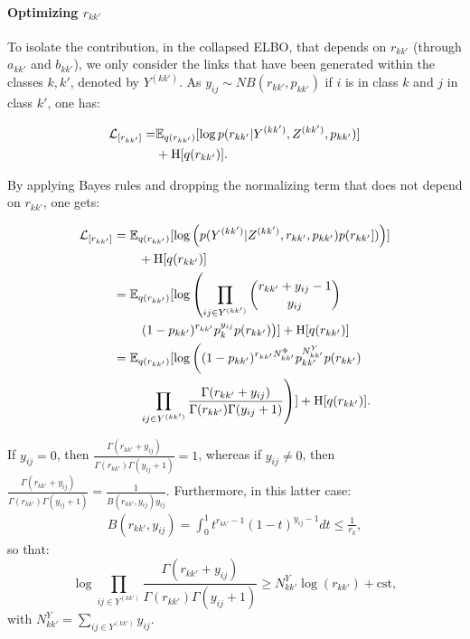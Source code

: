 \paragraph{Optimizing $r_{kk'}$}

To isolate the contribution, in the collapsed ELBO, that depends on $r_{kk'}$ (through $a_{kk'}$ and $b_{kk'}$), we only consider the links that have been generated within the classes $k,k'$, denoted by $Y^{(kk')}$. As $y_{ij} \sim NB(r_{kk'}, p_{kk'})$ if $i$ is in class $k$ and $j$ in class $k'$, one has:

\begin{align*}
\mathcal{L}_{[r_{kk'}]} = & \mathbb{E}_{q(r_{kk'})}[\log p(r_{kk'}|Y^{(kk')},Z^{(kk')},p_{kk'})] \\
& + \textrm{H}[q(r_{kk'})].
\end{align*}

By applying Bayes rules and dropping the normalizing term that does not depend on $r_{kk'}$, one gets:

\small{
\begin{align*}
\mathcal{L}_{[r_{kk'}]} &= \mathbb{E}_{q(r_{kk'})}[\log \left( p(Y^{(kk')}|Z^{(kk')}, r_{kk'}, p_{kk'}) p(r_{kk'}]) \right)] \\
	& \qquad + \textrm{H}[q(r_{kk'})] \\
    &= \mathbb{E}_{q(r_{kk'})}[\log \left( \prod_{ij\in Y^{(kk')}} \dbinom{r_{kk'} + y_{ij}-1}{y_{ij}} \right. \\
    & \qquad  \left. (1-p_{kk'})^{r_{kk'}} p_k^{y_{ij}} p(r_{kk'}) \right) ] + \textrm{H}[q(r_{kk'})] \\
    &= \mathbb{E}_{q(r_{kk'})}[\log \left( (1-p_{kk'})^{r_{kk'} N^{\Phi}_{kk'}} p_{kk'}^{N^{Y}_{kk'}} p(r_{kk'}) \right. \\
    &  \qquad  \left. \prod_{ij\in Y^{(kk')}} \frac{\Gamma(r_{kk'}+y_{ij})}{\Gamma(r_{kk'}) \Gamma(y_{ij}+1) }  \right) ] + \textrm{H}[q(r_{kk'})].
\end{align*}
}

\normalsize

If $y_{ij} = 0$, then $\frac{\Gamma(r_{kk'}+y_{ij})}{\Gamma(r_{kk'}) \Gamma(y_{ij}+1)} = 1$, whereas if $y_{ij} \ne 0$, then $\frac{\Gamma(r_{kk'}+y_{ij})}{\Gamma(r_{kk'}) \Gamma(y_{ij}+1)} = \frac{1}{B(r_{kk'}, y_{ij})y_{ij}}$. Furthermore, in this latter case:
%
\begin{align*}
B(r_{kk'}, y_{ij}) = \int_0^1 t^{r_{kk'}-1} (1-t)^{y_{ij}-1} dt  \leq \frac{1}{r_k},
\end{align*}
%
so that:
%
\begin{equation*}
\log \prod_{ij\in Y^{(kk')}} \frac{\Gamma(r_{kk'}+y_{ij})}{\Gamma(r_{kk'}) \Gamma(y_{ij}+1) } \geq N^Y_{kk'} \log(r_{kk'}) + \mathrm{cst},
\end{equation*}
%
with $N^Y_{kk'} = \sum_{ij\in Y^{(kk')}} y_{ij}$.

